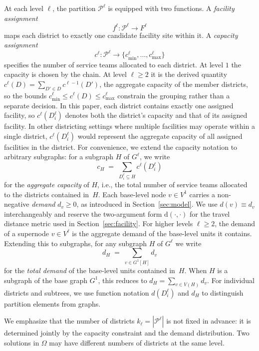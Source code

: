 \documentclass[11pt]{article}
\theoremstyle{definition}
\begin{document}
At each level $\ell$, the partition $\mathcal{P}^\ell$ is equipped with two
functions. A \emph{facility assignment}
%
\[
    f^\ell \colon \mathcal{P}^\ell \to F^\ell
\]
%
maps each district to exactly one candidate facility site within it. A
\emph{capacity assignment}
%
\[
    c^\ell \colon \mathcal{P}^\ell \to \{c^{\ell}_{\min}, \ldots, c^{\ell}_{\max}\}
\]
%
specifies the number of service teams allocated to each district. At level $1$ the capacity is chosen by the chain. At level $\ell \geq 2$ it is the derived quantity $c^\ell(D) = \sum_{D' \in D} c^{\ell-1}(D')$, the aggregate capacity of the member districts, so the bounds $c^\ell_{\min} \leq c^\ell(D) \leq c^\ell_{\max}$ constrain the grouping rather than a separate decision.  In this paper, each district contains exactly one assigned facility, so $c^\ell(D_i^\ell)$ denotes both the district's capacity and that of its assigned facility.  In
other districting settings where multiple facilities may operate within a single district, $c^\ell(D_i^\ell)$ would represent the aggregate capacity of all assigned facilities in the district.  For convenience, we extend the capacity notation to arbitrary subgraphs: for a subgraph $H$ of $G^\ell$, we write
%
\[
    c_H \;=\; \sum_{D_i^\ell \subseteq H} c^\ell(D_i^\ell)
\]
%
for the \emph{aggregate capacity} of $H$, i.e., the total number of service teams allocated to the districts contained in~$H$.
Each base-level node $v \in V^1$ carries a non-negative \emph{demand}
$d_v \geq 0$, as introduced in Section~\ref{sec:model}. We use $d(v) \equiv d_v$ interchangeably and reserve the two-argument form $\mathrm{d}(\cdot, \cdot)$ for the travel distance metric used in Section~\ref{sec:facility}.
For higher levels $\ell \geq 2$, the demand of a supernode $v \in V^\ell$
is the aggregate demand of the base-level units it contains.
Extending this to subgraphs, for any
subgraph $H$ of $G^\ell$ we write
%
\[
    d_H \;=\; \sum_{v \in G^1[H]} d_v
\]
%
for the \emph{total demand} of the base-level units contained in~$H$.  When
$H$ is a subgraph of the base graph $G^1$, this reduces to
$d_H = \sum_{v \in V(H)} d_v$.  For individual districts and subtrees, we
use function notation $d(D_i^\ell)$ and $d_H$ to distinguish partition
elements from graphs.

We emphasize that the number of districts $k_\ell = |\mathcal{P}^\ell|$ is not fixed in advance:
it is determined jointly by the capacity constraint and the demand distribution.
Two solutions in $\Omega$ may have different numbers of districts at the same
level.
\end{document}
